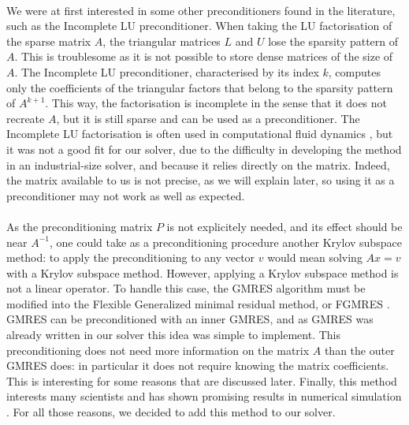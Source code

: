       \paragraph{}
      We were at first interested in some other preconditioners found in the literature, such as the Incomplete LU preconditioner.
      When taking the LU factorisation of the sparse matrix $A$, the triangular matrices $L$ and $U$ lose the sparsity pattern of $A$.
      This is troublesome as it is not possible to store dense matrices of the size of $A$.
      The Incomplete LU preconditioner, characterised by its index $k$, computes only the coefficients of the triangular factors that belong to the sparsity pattern of $A^{k+1}$.
      This way, the factorisation is incomplete in the sense that it does not recreate $A$, but it is still sparse and can be used as a preconditioner.
      The Incomplete LU factorisation is often used in computational fluid dynamics \cite{LiuZhangZhongEtAl2015, AhrabiMavriplis2020}, but it was not a good fit for our solver, due to the difficulty in developing the method in an industrial-size solver, and because it relies directly on the matrix.
      Indeed, the matrix available to us is not precise, as we will explain later, so using it as a preconditioner may not work as well as expected.

      \paragraph{}
      As the preconditioning matrix $P$ is not explicitely needed, and its effect should be near $A^{-1}$, one could take as a preconditioning procedure another Krylov subspace method: to apply the preconditioning to any vector $v$ would mean solving $Ax = v$ with a Krylov subspace method.
      However, applying a Krylov subspace method is not a linear operator.
      To handle this case, the GMRES algorithm must be modified into the Flexible Generalized minimal residual method, or FGMRES \cite{Saad1993, SimonciniSzyld2002}.
      GMRES can be preconditioned with an inner GMRES, and as GMRES was already written in our solver this idea was simple to implement.
      This preconditioning does not need more information on the matrix $A$ than the outer GMRES does: in particular it does not require knowing the matrix coefficients.
      This is interesting for some reasons that are discussed later.
      Finally, this method interests many scientists \cite{CoulaudGiraudRametEtAl2013, Vasseur2016} and has shown promising results in numerical simulation \cite{Pinel2010}.
      For all those reasons, we decided to add this method to our solver.

